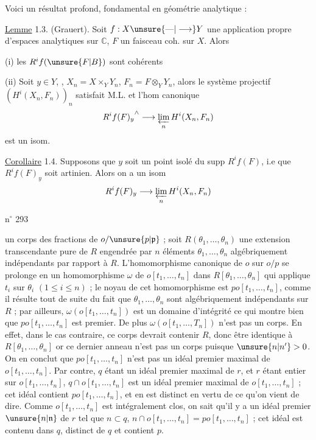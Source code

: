 Voici un résultat  profond, fondamental  en géométrie analytique :

\uline{Lemme} 1.3. (Grauert). Soit $f:X\unsure{\text{---}|\longrightarrow}Y$ une application propre d'espaces analytiques sur $\mathbb C$, $F$ un faisceau coh. sur $X$. Alors

(i) les $R^if(\unsure{F|B})$ sont cohérents

(ii) Soit $y\in Y$, , $X_n=X\times_Y Y_n$, $F_n=F\otimes_Y Y_n$, alors le système projectif $(H^i(X_n,F_n))_n$ satisfait M.L. et l'hom canonique
\[
{R^if(F)_y}^{\wedge}\longrightarrow\varprojlim_n H^i(X_n,F_n)
\]
est un isom.

\uline{Corollaire} 1.4. Supposons que $y$ soit un point isolé du supp $R^if(F)$,  i.e que $R^if(F)_y$ soit artinien. Alors on a un isom
\[
R^if(F)_y\longrightarrow\varprojlim_n H^i(X_n,F_n)
\]

\hfill n$^\circ$ 293

un corps des fractions de $o/\unsure{p|\mathfrak p}$ ; soit $R(\theta_1,\ldots,\theta_n)$ une extension transcendante pure de $R$ engendrée par $n$ éléments $\theta_1,\ldots,\theta_n$ algébriquement indépendants par rapport à $R$. L'homomorphisme canonique de $o$ sur $o/p$ se prolonge en un homomorphisme $\omega$ de $o[t_1,\ldots,t_n]$ dans $R[\theta_1,\ldots,\theta_n]$ qui applique $t_i$ sur $\theta_i$ $(1\leq i\leq n)$ ; le noyau de cet homomorphisme est $po[t_1,\ldots,t_n]$, comme il résulte tout de suite du fait que $\theta_1,\ldots,\theta_n$ sont algébriquement indépendants sur $R$ ; par ailleurs, $\omega(o[t_1,\ldots,t_n])$ est un domaine d'intégrité ce qui montre bien que $po[t_1,\ldots,t_n]$ est premier. De plus $\omega(o[t_1,\ldots,T_n])$ n'est pas un corps. En effet, dans le cas contraire, ce corps devrait contenir $R$, donc être identique à $R[\theta_1,\ldots,\theta_n]$ or ce dernier anneau n'est pas un corps puisque $\unsure{n|n'}>0$. On en conclut que $po[t_1,\ldots,t_n]$ n'est pas un idéal premier maximal de $o[t_1,\ldots,t_n]$. Par contre, $q$ étant un idéal premier maximal de $r$, et $r$ étant entier sur $o[t_1,\ldots,t_n]$, $q\cap o[t_1,\ldots,t_n]$ est un idéal premier maximal de $o[t_1,\ldots,t_n]$ ; cet idéal contient $po[t_1,\ldots,t_n]$, et en est distinct en vertu de ce qu'on vient de dire. Comme $o[t_1,\ldots,t_n]$ est intégralement clos, on sait qu'il y a un idéal premier $\unsure{n|\mathfrak n}$ de $r$ tel que $n\subset q$, $n\cap o[t_1,\ldots,t_n]=po[t_1,\ldots,t_n]$ ; cet idéal est contenu dans $q$, distinct de $q$ et contient $p$.

